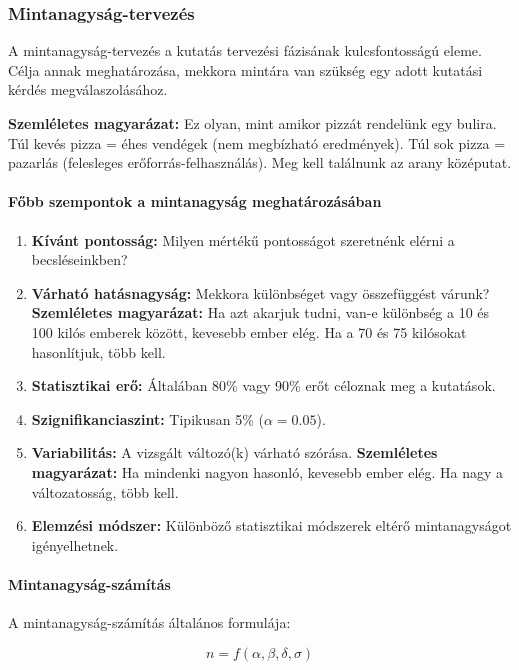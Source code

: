\documentclass[a4paper,12pt]{article}
\begin{document}
    \subsubsection{Mintanagyság-tervezés}

    A mintanagyság-tervezés a kutatás tervezési fázisának kulcsfontosságú eleme. Célja annak meghatározása, mekkora mintára van szükség egy adott kutatási kérdés megválaszolásához.

    \textbf{Szemléletes magyarázat:} Ez olyan, mint amikor pizzát rendelünk egy bulira. Túl kevés pizza = éhes vendégek (nem megbízható eredmények). Túl sok pizza = pazarlás (felesleges erőforrás-felhasználás). Meg kell találnunk az arany középutat.

    \paragraph{Főbb szempontok a mintanagyság meghatározásában}

    \begin{enumerate}
        \item \textbf{Kívánt pontosság:} Milyen mértékű pontosságot szeretnénk elérni a becsléseinkben?
        \item \textbf{Várható hatásnagyság:} Mekkora különbséget vagy összefüggést várunk?
        \textbf{Szemléletes magyarázat:} Ha azt akarjuk tudni, van-e különbség a 10 és 100 kilós emberek között, kevesebb ember elég. Ha a 70 és 75 kilósokat hasonlítjuk, több kell.
        \item \textbf{Statisztikai erő:} Általában 80\% vagy 90\% erőt céloznak meg a kutatások.
        \item \textbf{Szignifikanciaszint:} Tipikusan 5\% ($\alpha = 0.05$).
        \item \textbf{Variabilitás:} A vizsgált változó(k) várható szórása.
        \textbf{Szemléletes magyarázat:} Ha mindenki nagyon hasonló, kevesebb ember elég. Ha nagy a változatosság, több kell.
        \item \textbf{Elemzési módszer:} Különböző statisztikai módszerek eltérő mintanagyságot igényelhetnek.
    \end{enumerate}

    \paragraph{Mintanagyság-számítás}
    A mintanagyság-számítás általános formulája:

    \[ n = f(\alpha, \beta, \delta, \sigma) \]
\end{document}
